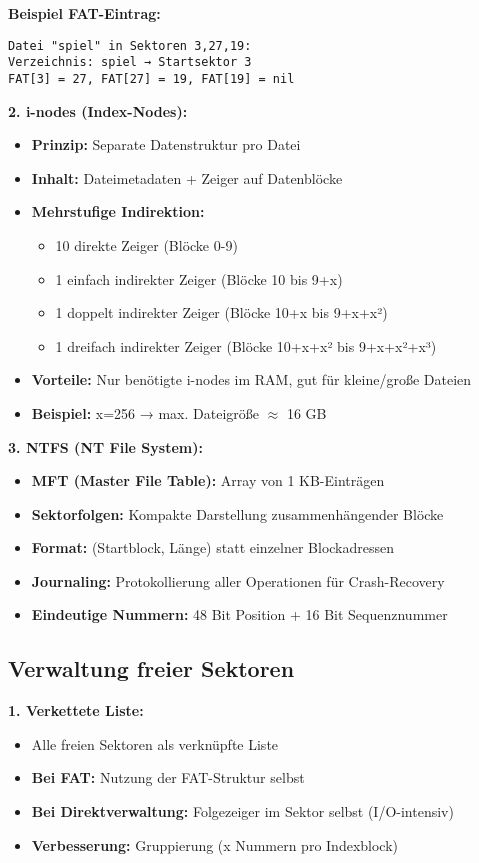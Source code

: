 \documentclass[9pt,a4paper]{extarticle}
\begin{document}
\begin{multicols*}{2}
\textbf{Beispiel FAT-Eintrag:}
\begin{verbatim}
Datei "spiel" in Sektoren 3,27,19:
Verzeichnis: spiel → Startsektor 3
FAT[3] = 27, FAT[27] = 19, FAT[19] = nil
\end{verbatim}

\textbf{2. i-nodes (Index-Nodes):}
\begin{itemize}
\item \textbf{Prinzip:} Separate Datenstruktur pro Datei
\item \textbf{Inhalt:} Dateimetadaten + Zeiger auf Datenblöcke
\item \textbf{Mehrstufige Indirektion:}
  \begin{itemize}
  \item 10 direkte Zeiger (Blöcke 0-9)
  \item 1 einfach indirekter Zeiger (Blöcke 10 bis 9+x)
  \item 1 doppelt indirekter Zeiger (Blöcke 10+x bis 9+x+x²)
  \item 1 dreifach indirekter Zeiger (Blöcke 10+x+x² bis 9+x+x²+x³)
  \end{itemize}
\item \textbf{Vorteile:} Nur benötigte i-nodes im RAM, gut für kleine/große Dateien
\item \textbf{Beispiel:} x=256 → max. Dateigröße $\approx$ 16 GB
\end{itemize}

\textbf{3. NTFS (NT File System):}
\begin{itemize}
\item \textbf{MFT (Master File Table):} Array von 1 KB-Einträgen
\item \textbf{Sektorfolgen:} Kompakte Darstellung zusammenhängender Blöcke
\item \textbf{Format:} (Startblock, Länge) statt einzelner Blockadressen
\item \textbf{Journaling:} Protokollierung aller Operationen für Crash-Recovery
\item \textbf{Eindeutige Nummern:} 48 Bit Position + 16 Bit Sequenznummer
\end{itemize}

\subsection{Verwaltung freier Sektoren}
\textbf{1. Verkettete Liste:}
\begin{itemize}
\item Alle freien Sektoren als verknüpfte Liste
\item \textbf{Bei FAT:} Nutzung der FAT-Struktur selbst
\item \textbf{Bei Direktverwaltung:} Folgezeiger im Sektor selbst (I/O-intensiv)
\item \textbf{Verbesserung:} Gruppierung (x Nummern pro Indexblock)
\end{itemize}


\end{multicols*}
\end{document}

